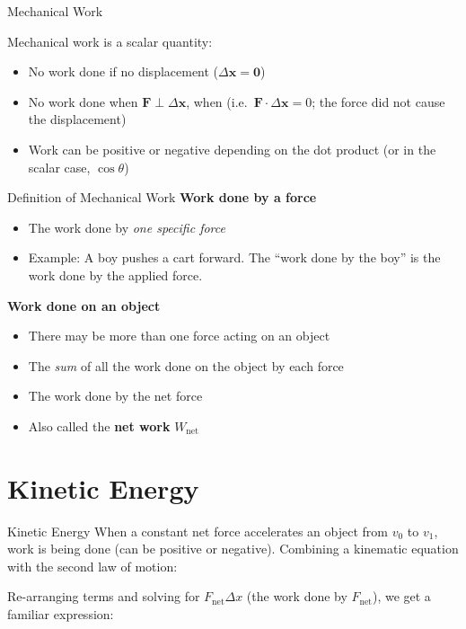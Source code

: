 \documentclass[12pt,compress,aspectratio=169]{beamer}
\begin{document}
\begin{frame}{Mechanical Work}

  Mechanical work is a scalar quantity:
  
  \begin{itemize}
  \item No work done if no displacement ($\Delta\bm{x}=\bm{0}$)
  \item No work done when $\bm{F}\perp\Delta\bm{x}$, when (i.e.\
    $\bm{F}\cdot\Delta\bm{x}=0$; the force did not cause the displacement)
  \item Work can be positive or negative depending on the dot product (or in
    the scalar case, $\cos\theta$)
  \end{itemize}
\end{frame}



\begin{frame}{Definition of Mechanical Work}
  \textbf{Work done by a force}
  \begin{itemize}
  \item The work done by \emph{one specific force}
  \item Example: A boy pushes a cart forward. The ``work done by the boy'' is
    the work done by the applied force.
  \end{itemize}

  \vspace{.15in}\textbf{Work done on an object}
  \begin{itemize}
  \item There may be more than one force acting on an object
  \item The \emph{sum} of all the work done on the object by each force
  \item The work done by the net force
  \item Also called the \textbf{net work} $W_\text{net}$
  \end{itemize}
\end{frame}



\section{Kinetic Energy}

\begin{frame}{Kinetic Energy}
  When a constant net force accelerates an object from $v_0$ to $v_1$, work is
  being done (can be positive or negative). Combining a kinematic equation with
  the second law of motion:


  Re-arranging terms and solving for $F_\text{net}\Delta x$ (the work done by
  $F_\text{net}$), we get a familiar expression:

\end{frame}
\end{document}
